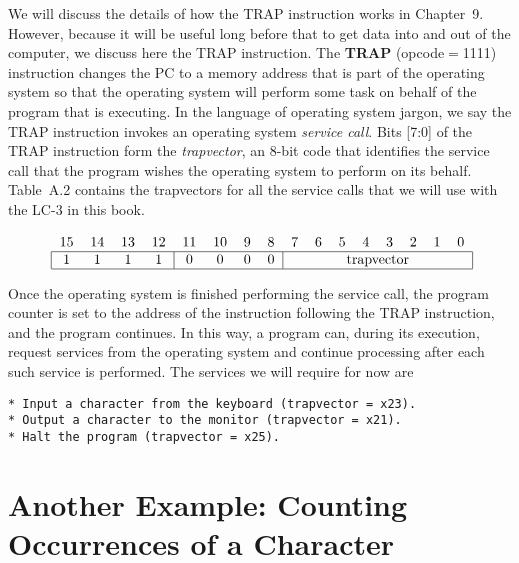 \documentclass{patt}
\begin{document}
We will discuss the details of how the TRAP instruction works in Chapter~9.
However, because it will be useful long before that to get data
into and out of the computer, we discuss here the TRAP instruction.
The {\bf TRAP} (opcode${}={}$1111) instruction changes the PC to a memory 
address that is part
of the operating system so that the operating system will perform some
task on behalf of the program that is executing.  In the language of
operating system jargon, we say the TRAP instruction invokes an
operating system {\em service call}.  Bits [7:0] of the TRAP instruction
form the {\em trapvector}, an 8-bit code that identifies the service call 
that the program wishes the operating system to perform on its behalf.  
Table~A.2 contains the trapvectors for all the service calls that we will 
use with the LC-3 in this book.

\begin{equation*}
\mbox{\renewcommand{\tabcolsep}{6pt}
\begin{tabular}
{cccccccccccccccc}
15 & 14 & 13 & 12 & 11 & 10 & 9 & 8 & 7 & 6 & 5 & 4 & 3 & 2 & 1 & 0 \\
\hline
\multicolumn{1}{|c}{1}&
\multicolumn{1}{c}{1}&
\multicolumn{1}{c}{1}&
\multicolumn{1}{c}{1}&
\multicolumn{1}{|c}{0}&
\multicolumn{1}{c}{0}&
\multicolumn{1}{c}{0}&
\multicolumn{1}{c}{0}&
\multicolumn{8}{|c|}{trapvector}\\
\hline
\end{tabular}}
\end{equation*}

Once the operating system is finished performing the service call, the
program counter is set to the address of the instruction following the
TRAP instruction, and the program continues.  In this way, a program
can, during its execution, request services from the operating system
and continue processing after each such service is performed.  The
services we will require for now are

\color{seventyblack}
\begin{Verbatim}[fontsize=\fontsize{9}{14}]
* Input a character from the keyboard (trapvector = x23).
* Output a character to the monitor (trapvector = x21).
* Halt the program (trapvector = x25).
\end{Verbatim}
\normalcolor

\section{Another Example: Counting Occurrences
of a Character}\label{excharcount}
\end{document}
